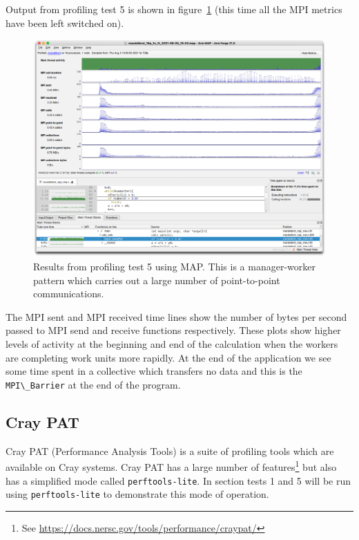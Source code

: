 \documentclass[a4paper,titlepage]{article}
\begin{document}
Output from profiling test 5 is shown in figure~\ref{fig:MAP_test5} (this time all the MPI metrics have been left switched on).
\begin{figure}[htbp]
\begin{center}
\includegraphics[scale=0.3]{figures/MAP_test5}
\caption{Results from profiling test 5 using MAP. This is a manager-worker pattern which carries out a large number of point-to-point communications.}
\label{fig:MAP_test5}
\end{center}
\end{figure}
The MPI sent and MPI received time lines show the number of bytes per second passed to MPI send and receive functions respectively. These plots show higher levels of activity at the beginning and end of the calculation when the workers are completing work units more rapidly. At the end of the application we see some time spent in a collective which transfers no data and this is the \verb+MPI\_Barrier+ at the end of the program.

\pagebreak


\subsection{Cray PAT}

Cray PAT (Performance Analysis Tools) is a suite of profiling tools which are available on Cray systems. Cray PAT has a large number of features\footnote{See \url{https://docs.nersc.gov/tools/performance/craypat/}} but also has a simplified mode called \verb+perftools-lite+. In section tests 1 and 5 will be run using \verb+perftools-lite+ to demonstrate this mode of operation. 
\end{document}
